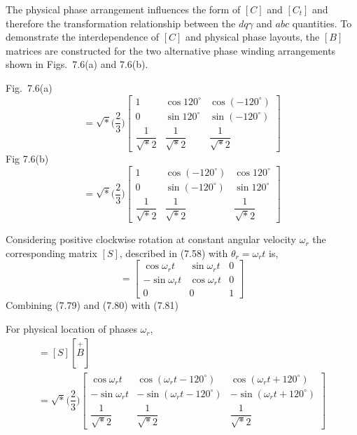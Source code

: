 \documentclass[a4paper,numbers=noenddot,12pt]{scrbook}
\begin{document}
    The physical phase arrangement influences the form of $[C]$ and $[C_t]$ and therefore the transformation relationship between the $d q \gamma$ and $abc$ quantities. To demonstrate the interdependence of $[C]$ and physical phase layouts, the $[B]$ matrices are constructed for the two alternative phase winding arrangements shown in Figs.\ 7.6(a) and 7.6(b).
    
    Fig.\ 7.6(a)
    \begin{equation}
        [\overset{+}{B}] = \sqrt*{\Big(\dfrac{2}{3} \Big)}
        \begin{bmatrix}
            1 & \cos 120^{\circ} & \cos (-120^{\circ}) \\
            0 & \sin 120^{\circ} & \sin (-120^{\circ}) \\
            \dfrac{1}{\sqrt*{2}} & \dfrac{1}{\sqrt*{2}} & \dfrac{1}{\sqrt*{2}}
        \end{bmatrix}
        \label{eq:Eq7.79}
    \end{equation}
    Fig 7.6(b)
    \begin{equation}
        [\overset{-}{B}] = \sqrt*{\Big(\dfrac{2}{3} \Big)}
        \begin{bmatrix}
            1 & \cos (- 120^{\circ}) & \cos 120^{\circ} \\
            0 & \sin (- 120^{\circ}) & \sin 120^{\circ} \\
            \dfrac{1}{\sqrt*{2}} & \dfrac{1}{\sqrt*{2}} & \dfrac{1}{\sqrt*{2}}
        \end{bmatrix}
        \label{eq:Eq7.80}
    \end{equation}

    Considering positive clockwise rotation at constant angular velocity $\omega_r$ the corresponding matrix $[S]$, described in (7.58) with  $\theta_r = \omega_r t$ is,
    \begin{equation}
        [S] = 
        \begin{bmatrix}
            \cos \omega_r t & \sin \omega_r t & 0 \\
            - \sin \omega_r t  & \cos \omega_r t & 0 \\
            0 & 0 & 1
        \end{bmatrix}
        \label{eq:Eq7.81}
    \end{equation}
    Combining (7.79) and (7.80) with (7.81)

    For physical location of phases $\omega_r$,
    \begin{multline}
        [\overset{+}{C}] = [S] [\overset{+}{B}] \\
        = \sqrt*{\Big( \dfrac{2}{3} \Big)}
        \begin{bmatrix}
            \cos \omega_r t & \cos (\omega_r t - 120^{\circ}) & \cos (\omega_r t + 120^{\circ}) \\
            - \sin \omega_r t & - \sin (\omega_r t - 120^{\circ}) & - \sin (\omega_r t + 120^{\circ}) \\
            \dfrac{1}{\sqrt*{2}} & \dfrac{1}{\sqrt*{2}} & \dfrac{1}{\sqrt*{2}}
        \end{bmatrix}
        \label{eq:Eq7.82}
    \end{multline}
\end{document}
